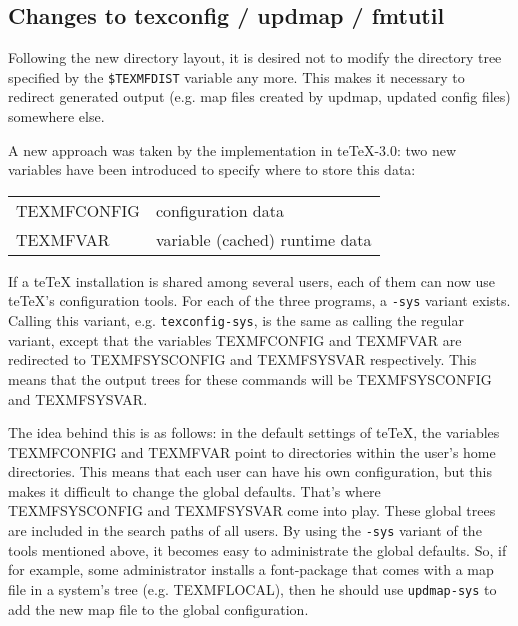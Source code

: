 \documentclass[11pt,a4paper]{article}
\begin{document}
\subsection{Changes to texconfig / updmap / fmtutil}
\label{sec:texconfig-changes}
Following the new directory layout, it is desired not to modify
the directory tree specified by the \verb+$TEXMFDIST+ %
variable any more. This makes it necessary to redirect generated
output (e.g. map files created by updmap, updated config files)
somewhere else.

A new approach was taken by the implementation in te\TeX-3.0: two new
variables have been introduced to specify where to store this data:
\medskip

\begin{tabular}{ll}
  TEXMFCONFIG & configuration data\\
  TEXMFVAR & variable (cached) runtime data
\end{tabular}
\medskip

If a te\TeX{} installation is shared among several users, each of them
can now use te\TeX{}'s configuration tools. For each of the three
programs, a \verb+-sys+ variant exists. Calling this variant, e.g.
\verb+texconfig-sys+, is the same as calling the regular variant,
except that the variables TEXMFCONFIG and TEXMFVAR are redirected to
TEXMFSYSCONFIG and TEXMFSYSVAR respectively. This means that the
output trees for these commands will be TEXMFSYSCONFIG and
TEXMFSYSVAR.

The idea behind this is as follows: in the default settings of te\TeX,
the variables TEXMFCONFIG and TEXMFVAR point to directories within the
user's home directories. This means that each user can have his own
configuration, but this makes it difficult to change the global
defaults. That's where TEXMFSYSCONFIG and TEXMFSYSVAR come into play.
These global trees are included in the search paths of all users. By
using the \verb+-sys+ variant of the tools mentioned above, it becomes
easy to administrate the global defaults. So, if for example, some
administrator installs a font-package that comes with a map file in a
system's tree (e.g.  TEXMFLOCAL), then he should use \verb+updmap-sys+
to add the new map file to the global configuration.
\end{document}
